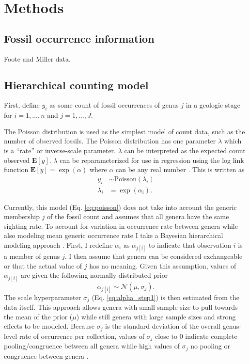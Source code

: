 \documentclass[12pt,letterpaper]{article}
\begin{document}
\section{Methods}

\subsection{Fossil occurrence information}
Foote and Miller data.

\subsection{Hierarchical counting model}
First, define \(y_{i}\) as some count of fossil occurrences of genus \(j\) in a geologic stage for \(i = 1, \dots, n\) and \(j = 1, \dots, J\).

The Poisson distribution is used as the simplest model of count data, such as the number of observed fossils. The Poisson distribution has one parameter \(\lambda\) which is a ``rate'' or inverse-scale parameter. \(\lambda\) can be interpreted as the expected count observed \(\mathbf{E}[y]\). \(\lambda\) can be reparameterized for use in regression using the log link function \(\mathbf{E}[y] = \exp(\alpha)\) where \(\alpha\) can be any real number \citep{Gelman2007}. This is written as
\begin{align}
  y_{i} &\sim \mathrm{Poisson}(\lambda_{i}) \nonumber\\
  \lambda_{i} &= \exp(\alpha_{i}).
  \label{eq:poisson} 
\end{align}

Currently, this model (Eq. \ref{eq:poisson}) does not take into account the generic membership \(j\) of the fossil count and assumes that all genera have the same sighting rate. To account for variation in occurrence rate between genera while also modeling mean generic occurrence rate I take a Bayesian hierarchical modeling approach \citep{Gelman2007,Gelman2013b}. First, I redefine \(\alpha_{i}\) as \(\alpha_{j[i]}\) to indicate that observation \(i\) is a member of genus \(j\). I then assume that genera can be considered exchangeable or that the actual value of \(j\) has no meaning. Given this assumption, values of \(\alpha_{j[i]}\) are given the following normally distributed prior 
\begin{equation}
  \alpha_{j[i]} \sim \mathcal{N}(\mu, \sigma_{j}).
  \label{eq:alpha_step1}
\end{equation}
The scale hyperparameter \(\sigma_{j}\) (Eq. \ref{eq:alpha_step1}) is then estimated from the data itself. This approach allows genera with small sample size to pull towards the mean of the prior (\(\mu\)) while still genera with large sample sizes and strong effects to be modeled. Because \(\sigma_{j}\) is the standard deviation of the overall genus-level rate of occurrence per collection, values of \(\sigma_{j}\) close to 0 indicate complete pooling/congruence between all genera while high values of \(\sigma_{j}\) no pooling or congruence between genera \citep{Gelman2013b}.
\end{document}
